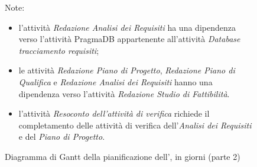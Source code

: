\pagebreak
\begin{figure}[H]
\label{tab:genweeks2}
\caption{Diagramma di Gantt della pianificazione dell'\AR, in giorni (parte 2)}

Note:
\begin{itemize}
	\item l'attività \emph{Redazione Analisi dei Requisiti} ha una dipendenza verso l'attività PragmaDB appartenente all'attività \emph{Database tracciamento requisiti};
	\item le attività \emph{Redazione Piano di Progetto}, \emph{Redazione Piano di Qualifica} e \emph{Redazione Analisi dei Requisiti} hanno una dipendenza verso l'attività \emph{Redazione Studio di Fattibilità}.
	\item l'attività \emph{Resoconto dell'attività di verifica} richiede il completamento delle attività di verifica dell'\emph{Analisi dei Requisiti} e del \emph{Piano di Progetto}.
\end{itemize} 
\end{figure}
		
